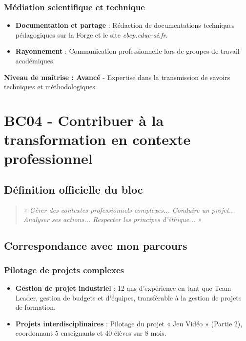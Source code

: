 \subsubsection{Médiation scientifique et technique}
\begin{itemize}[leftmargin=*]
    \item \textbf{Documentation et partage} : Rédaction de documentations techniques pédagogiques sur la Forge et le site \textit{ebep.educ-ai.fr}.
    \item \textbf{Rayonnement} : Communication professionnelle lors de groupes de travail académiques.
\end{itemize}

\textbf{Niveau de maîtrise : Avancé} - Expertise dans la transmission de savoirs techniques et méthodologiques.

\vspace{1cm}

\section{BC04 - Contribuer à la transformation en contexte professionnel}

\subsection{Définition officielle du bloc}
\begin{quote}
\textit{« Gérer des contextes professionnels complexes... Conduire un projet... Analyser ses actions... Respecter les principes d'éthique... »} \parencite{rncp38152}
\end{quote}

\subsection{Correspondance avec mon parcours}

\subsubsection{Pilotage de projets complexes}
\begin{itemize}[leftmargin=*]
    \item \textbf{Gestion de projet industriel} : 12 ans d'expérience en tant que Team Leader, gestion de budgets et d'équipes, transférable à la gestion de projets de formation.
    \item \textbf{Projets interdisciplinaires} : Pilotage du projet « Jeu Vidéo » (Partie 2), coordonnant 5 enseignants et 40 élèves sur 8 mois.
\end{itemize}


